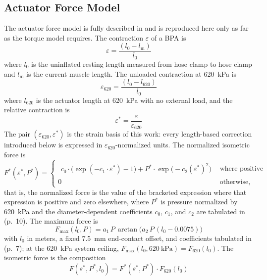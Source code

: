 \documentclass[utf8]{FrontiersinHarvard} %
\begin{document}
\subsection{Actuator Force Model}\label{sec:force_model}

The actuator force model is fully described in \citet{bolen_2026} and is reproduced here only as far as the torque model requires. The contraction $\varepsilon$ of a BPA is
\begin{equation}
    {\varepsilon} = \frac{(l_{0}-l_\text{m})}{l_{0}} \label{eq:strain}
\end{equation}
where $l_{0}$ is the uninflated resting length measured from hose clamp to hose clamp and $l_\text{m}$ is the current muscle length. The unloaded contraction at \qty{620}{\kPa} is
\begin{equation}
    \varepsilon_{620} = \frac{(l_{0}-l_{620})}{l_{0}} \label{eq:max_strain}
\end{equation}
where $l_{620}$ is the actuator length at \qty{620}{\kPa} with no external load, and the relative contraction is
\begin{equation}
    \varepsilon^* = \frac{\varepsilon}{\varepsilon_{620}} \label{eq:rel_strain}
\end{equation}
The pair $(\varepsilon_{620}, \varepsilon^*)$ is the strain basis of this work: every length-based correction introduced below is expressed in $\varepsilon_{620}$-normalized units. The normalized isometric force is
\begin{equation}
F^*(\varepsilon^*,P^*)=
\begin{cases}
\begin{aligned}
c_0\cdot\bigl(\exp(-c_1 \cdot \varepsilon^*)-1\bigr)
+ P^*\cdot\exp\!\bigl(-c_2(\varepsilon^*)^{2}\bigr)
\end{aligned}
& \text{where positive}\\[10pt]
0
& \text{otherwise,}
\end{cases}\label{eq:Fstar}
\end{equation}
that is, the normalized force is the value of the bracketed expression where that expression is positive and zero elsewhere, where $P^*$ is pressure normalized by \qty{620}{\kPa} and the diameter-dependent coefficients $c_0$, $c_1$, and $c_2$ are tabulated in \citet{bolen_2026} (p.~10). The maximum force is
\begin{equation}
    F_{\mathrm{max}}(l_{0},P) = a_1 \, P \, \arctan\!\bigl(a_2 \, P \, (l_{0}-0.0075)\bigr) \label{eq:Fmax_3D}
\end{equation}
with $l_{0}$ in meters, a fixed \qty{7.5}{\mm} end-contact offset, and coefficients tabulated in \citet{bolen_2026} (p.~7); at the \qty{620}{\kPa} system ceiling, $F_{\mathrm{max}}(l_{0},\qty{620}{\kPa}) = F_{620}(l_{0})$. The isometric force is the composition
\begin{equation}
   F(\varepsilon^*,P^*,l_{0}) = F^*(\varepsilon^*,P^*) \cdot F_{620}(l_{0}) \label{eq:force}
\end{equation}
\end{document}
